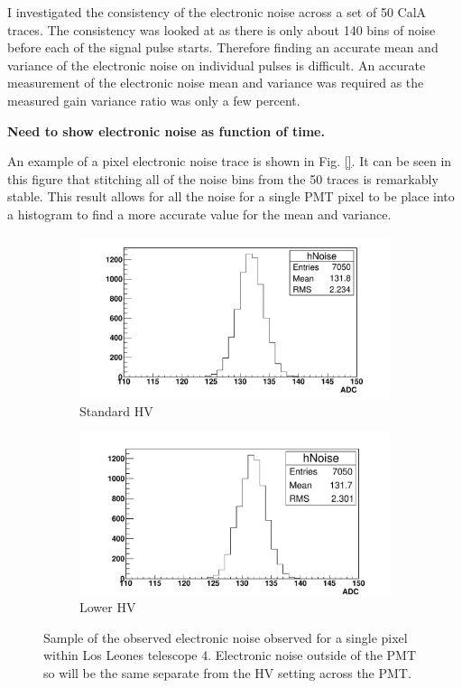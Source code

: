 I investigated the consistency of the electronic noise across a set of 50 CalA traces. The consistency was looked at as there is only about 140 bins of noise before each of the signal pulse starts. Therefore finding an accurate mean and variance of the electronic noise on individual pulses is difficult. An accurate measurement of the electronic noise mean and variance was required as the measured gain variance ratio was only a few percent.

\textbf{Need to show electronic noise as function of time.}

An example of a pixel electronic noise trace is shown in Fig. \ref{}. It can be seen in this figure that stitching all of the noise bins from the 50 traces is remarkably stable. This result allows for all the noise for a single PMT pixel to be place into a histogram to find a more accurate value for the mean and variance.

\begin{figure} %
\centering
\begin{subfigure}[b]{0.95\textwidth}
\includegraphics[width=\textwidth]{chapters/graphs/GainVarsMeas/LL_m04_2016-06-11/example_NoiseHist1.pdf}
\caption{Standard HV}
\end{subfigure}
\vspace{3mm}
\begin{subfigure}[b]{0.95\textwidth}
\includegraphics[width=\textwidth]{chapters/graphs/GainVarsMeas/LL_m04_2016-06-11/example_NoiseHist2.pdf}
\caption{Lower HV}
\end{subfigure}
\caption{Sample of the observed electronic noise observed for a single pixel within Los Leones telescope 4. Electronic noise outside of the PMT so will be the same separate from the HV setting across the PMT.}
\end{figure}

